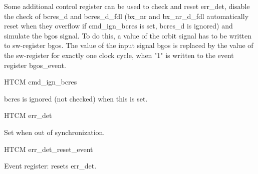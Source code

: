 Some additional control register can be used to check and reset err\_det, disable the check of bcres\_d and bcres\_d\_fdl (bx\_nr and bx\_nr\_d\_fdl automatically reset when they overflow if cmd\_ign\_bcres is set, bcres\_d is ignored) and simulate the bgos signal. To do this, a value of the orbit signal has to be written to sw-register bgos. The value of the input signal bgos is replaced by the value of the sw-register for exactly one clock cycle, when "1" is written to the event register bgos\_event.

\begin{register}{H}{TCM cmd\_ign\_bcres}{}%
	\label{cmd_ign_bcres}%
	\regnewline%

	\begin{regdesc}
	\begin{reglist}
 		\item [cmd\_ign\_bcres] bcres is ignored (not checked) when this is set.
	\end{reglist}
	\end{regdesc}
\end{register}

\begin{register}{H}{TCM err\_det}{}%
	\label{err_det}%
	\regfield{err\_det}{1}{0}{0}%
	\regnewline%

	\begin{regdesc}
	\begin{reglist}
		\item [err\_det] Set when out of synchronization.
	\end{reglist}
	\end{regdesc}
\end{register}

\begin{register}{H}{TCM err\_det\_reset\_event}{}%
	\label{err_det_reset_event}%
	\regnewline%

	\begin{regdesc}
	\begin{reglist}
 		\item [err\_det\_reset\_event] Event register: resets err\_det.
	\end{reglist}
	\end{regdesc}
\end{register}

